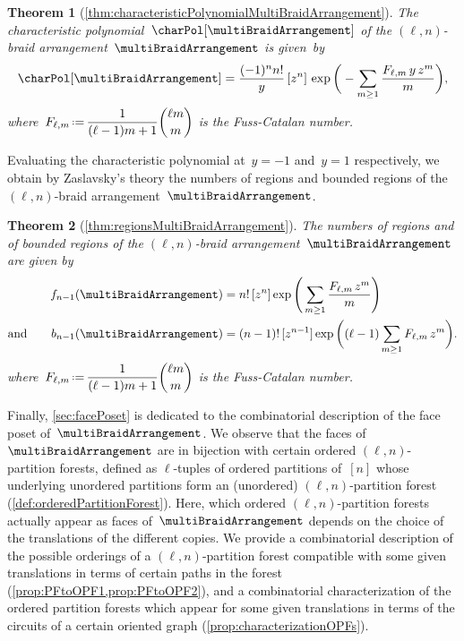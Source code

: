 \documentclass{amsart}
\newtheorem*{theorem*}{Theorem}
\theoremstyle{definition}
\newcommand{\eqdef}{\mbox{\,\raisebox{0.2ex}{\scriptsize\ensuremath{\mathrm:}}\ensuremath{=}\,}} %
\begin{document}
\begin{theorem*}[\cref{thm:characteristicPolynomialMultiBraidArrangement}]
The characteristic polynomial~$\charPol[\multiBraidArrangement]$ of the $(\ell,n)$-braid arrangement~$\multiBraidArrangement$ is given~by
\[
\charPol[\multiBraidArrangement] = \frac{(-1)^n n!}{y} \, [z^n] \, \exp \bigg( - \sum_{m \ge 1} \frac{F_{\ell,m} \, y \, z^m}{m} \bigg) ,
\]
where~$\displaystyle F_{\ell,m} \eqdef \frac{1}{(\ell-1)m+1} \binom{\ell m}{m}$ is the Fuss-Catalan number.
\end{theorem*}

Evaluating the characteristic polynomial at~$y = -1$ and~$y = 1$ respectively, we obtain by Zaslavsky's theory the numbers of regions and bounded regions of the $(\ell,n)$-braid arrangement~$\multiBraidArrangement$.

\begin{theorem*}[\cref{thm:regionsMultiBraidArrangement}]
The numbers of regions and of bounded regions of the $(\ell,n)$-braid arrangement~$\multiBraidArrangement$ are given by
\begin{align*}
f_{n-1}(\multiBraidArrangement) 
& = n! \, [z^n] \exp \Bigg( \sum_{m \ge 1} \frac{F_{\ell,m} \, z^m}{m} \Bigg) \\
\text{and}\qquad
b_{n-1}(\multiBraidArrangement)
& = (n-1)! \, [z^{n-1}] \exp \bigg( (\ell-1) \sum_{m \ge 1} F_{\ell,m} \, z^m \bigg).
\end{align*}
where~$\displaystyle F_{\ell,m} \eqdef \frac{1}{(\ell-1)m+1} \binom{\ell m}{m}$ is the Fuss-Catalan number.
\end{theorem*}

Finally, \cref{sec:facePoset} is dedicated to the combinatorial description of the face poset of~$\multiBraidArrangement$.
We observe that the faces of~$\multiBraidArrangement$ are in bijection with certain ordered $(\ell,n)$-partition forests, defined as $\ell$-tuples of ordered partitions of~$[n]$ whose underlying unordered partitions form an (unordered) $(\ell,n)$-partition forest (\cref{def:orderedPartitionForest}).
Here, which ordered $(\ell,n)$-partition forests actually appear as faces of~$\multiBraidArrangement$ depends on the choice of the translations of the different copies.
We provide a combinatorial description of the possible orderings of a $(\ell,n)$-partition forest compatible with some given translations in terms of certain paths in the forest (\cref{prop:PFtoOPF1,prop:PFtoOPF2}), and a combinatorial characterization of the ordered partition forests which appear for some given translations in terms of the circuits of a certain oriented graph (\cref{prop:characterizationOPFs}).
\end{document}
